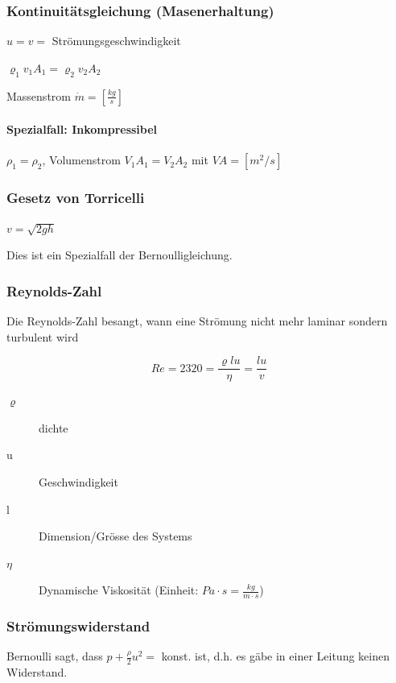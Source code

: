 \documentclass[a4paper]{scrartcl}
\begin{document}
\subsubsection{Kontinuitätsgleichung (Masenerhaltung)}


$u = v = $ Strömungsgeschwindigkeit 

$\varrho_1 v_1 A_1 = \varrho_2 v_2 A_2$

Massenstrom $\dot{m} = \left[ \frac{kg}{s} \right]$

\paragraph{Spezialfall: Inkompressibel} $\rho_1 = \rho_2$, Volumenstrom $V_1 A_1 = V_2 A_2$ mit $VA = \left[ m^2/s \right]$


\subsubsection{Gesetz von Torricelli}

$v = \sqrt{2gh}$

Dies ist ein Spezialfall der Bernoulligleichung.

\subsubsection{Reynolds-Zahl}

Die Reynolds-Zahl besangt, wann eine Strömung nicht mehr laminar sondern turbulent wird

\[
	Re = 2320 = \frac{\varrho lu}{\eta} = \frac{lu}{v}
\]

\begin{description}
\item[$\varrho$] dichte
\item[u] Geschwindigkeit
\item[l] Dimension/Grösse des Systems
\item[$\eta$] Dynamische Viskosität (Einheit: $Pa \cdot s = \frac{kg}{m \cdot s}$)
\end{description}


\subsubsection{Strömungswiderstand}

Bernoulli sagt, dass $p + \frac{\rho}{2} u^2 =$ konst. ist, d.h. es gäbe in einer Leitung keinen Widerstand.
\end{document}
